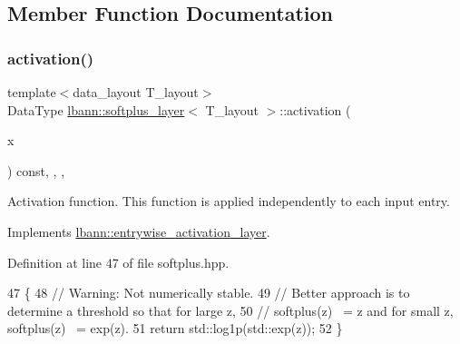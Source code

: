 \subsection{Member Function Documentation}
\mbox{\label{classlbann_1_1softplus__layer_aff73da03e891b4ea54d5ffc0618425b4}} 
\subsubsection{\texorpdfstring{activation()}{activation()}}
{\footnotesize\ttfamily template$<$data\+\_\+layout T\+\_\+layout$>$ \\
Data\+Type \hyperlink{classlbann_1_1softplus__layer}{lbann\+::softplus\+\_\+layer}$<$ T\+\_\+layout $>$\+::activation (\begin{DoxyParamCaption}\item[{Data\+Type}]{x }\end{DoxyParamCaption}) const\hspace{0.3cm}{\ttfamily [inline]}, {\ttfamily [override]}, {\ttfamily [protected]}, {\ttfamily [virtual]}}

Activation function. This function is applied independently to each input entry. 

Implements \hyperlink{classlbann_1_1entrywise__activation__layer_a69269401530a2112b66660383464bab9}{lbann\+::entrywise\+\_\+activation\+\_\+layer}.



Definition at line 47 of file softplus.\+hpp.


\begin{DoxyCode}
47                                                  \{
48     \textcolor{comment}{// Warning: Not numerically stable.}
49     \textcolor{comment}{// Better approach is to determine a threshold so that for large z,}
50     \textcolor{comment}{// softplus(z) ~= z and for small z, softplus(z) ~= exp(z).}
51     \textcolor{keywordflow}{return} std::log1p(std::exp(z));
52   \}
\end{DoxyCode}
\mbox{\label{classlbann_1_1softplus__layer_a164deff1fd79a8eea743580eba4f6a60}} 
